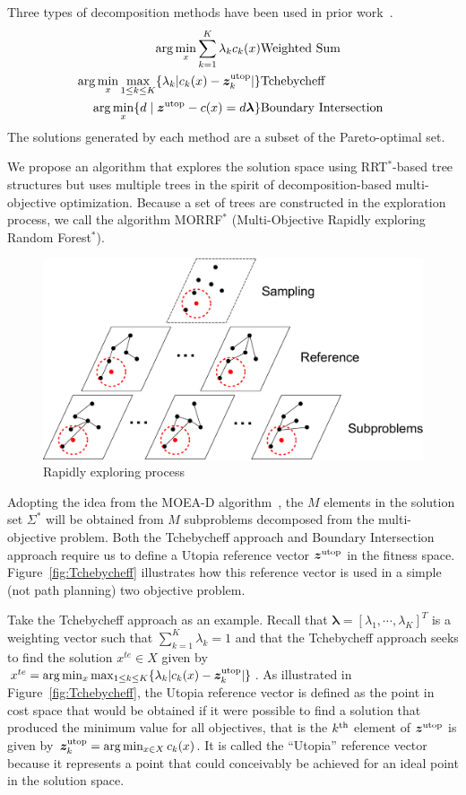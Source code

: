 \documentclass[phd]{byuprop}
\begin{document}
Three types of decomposition methods have been used in prior work~\cite{Zhang2007}.
\begin{eqnarray}
\arg\min_x \sum_{k=1}^{K} \lambda_{k} c_{k} (x) & {\rm Weighted \ Sum} \label{eq:weighted}\\
\arg\min_x\max_{1 \leq k \leq K}  \{ \lambda_{k} | c_{k}(x) - \bm{z}^{\rm utop}_{k}  | \} & {\rm Tchebycheff} \label{eq:Tchebycheff}\\
\arg\min_x \{ d \mid \bm{z}^{\rm utop} - c(x) = d \bm{\lambda} \} & {\rm Boundary \ Intersection \ } \label{eq:boundary}
\end{eqnarray}
The solutions generated by each method are a subset of the Pareto-optimal set.

We propose an algorithm that explores the solution space using RRT$^{*}$-based tree structures but uses multiple trees in the spirit of decomposition-based multi-objective optimization.
Because a set of trees are constructed in the exploration process, we call the algorithm MORRF$^{*}$ (Multi-Objective Rapidly exploring Random Forest$^{*}$).

\begin{figure}
	\centering
	\includegraphics[width=0.55\linewidth]{./fig/MORRTstar}
	\caption{Rapidly exploring process}
	\label{fig:MORRTstar}
\end{figure}

Adopting the idea from the MOEA-D algorithm~\cite{Zhang2007}, the $M$ elements in the solution set $\Sigma^{*}$ will be obtained from $ M $ subproblems decomposed from the multi-objective problem. 
Both the Tchebycheff approach and Boundary Intersection approach require us to define a Utopia reference vector $ \bm{z}^{\rm utop} $ in the fitness space. 
Figure~\ref{fig:Tchebycheff} illustrates how this reference vector is used in a simple (not path planning) two objective problem.  

Take the Tchebycheff approach as an example.
Recall that  $ \bm{\lambda} = [ \lambda_{1} , \cdots , \lambda_{K}  ]^{T} $ is a weighting vector such that $ \sum_{k=1}^{K} \lambda_{k} = 1 $ and that the Tchebycheff approach seeks to find the solution $ x^{te}\in X $ given by $ x^{te} = \arg\min_x \max_{1 \leq k \leq K}  \{ \lambda_{k} | c_{k}(x) - \bm{z}^{\rm utop}_{k}  | \} $.  
As illustrated in Figure~\ref{fig:Tchebycheff}, the Utopia reference vector is defined as the point in cost space that would be obtained if it were possible to find a solution that produced the minimum value for all objectives, that is the $k^{\rm th}$ element of $\bm{z}^{\rm utop}$ is given by $\bm{z}^{\rm utop}_{k} = \arg \min_{x \in X} c_{k}(x)$.  
It is called the ``Utopia'' reference vector because it represents a point that could conceivably be achieved for an ideal point in the solution space.
\end{document}
